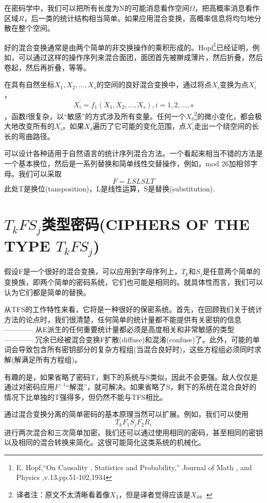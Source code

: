 \documentclass[]{article}
\begin{document}
在密码学中，我们可以把所有长度为N的可能消息看作空间$\Omega$，把高概率消息看作区域$R$，后一类的统计结构相当简单。如果应用混合变换，高概率信息将均匀地分散在整个空间。

好的混合变换通常是由两个简单的非交换操作的乘积形成的。Hopf\footnote{E. Hopf,“On Causality , Statistics and Probability,” Journal of Math , and Physics ,v.13,pp.51-102,1934 }已经证明，例如，可以通过这样的操作序列来混合面团，面团首先被擀成薄片，然后折叠，然后卷起，然后再折叠，等等。

在具有自然坐标$X_1,X_2,\ldots,X_s$的空间的良好混合变换中，通过将点$X_i$变换为点$X_i^{'}$，
\[X_i^{'}=f_1(X_1,X_2,\ldots,X_s),i=1,2,\ldots,s\]
，函数f很复杂，以“敏感”的方式涉及所有变量。任何一个$X_\delta$\footnote{译者注：原文不太清晰看着像$X_3$，但是译者觉得应该是$X_\delta$。}的微小变化，都会极大地改变所有的$X_i^{'}$。如果$X_\delta$遍历了它可能的变化范围，点$X_i^{'}$走出一个绕空间的长长的弯曲路径。

可以设计各种适用于自然语言的统计序列混合方法。一个看起来相当不错的方法是一个基本换位，然后是一系列替换和简单线性交替操作，例如，mod 26加相邻字母。我们可以采取
\[F=LSLSLT\]
此处T是换位(tansposition)，L是线性运算，S是替换(substitution).

\newpage
%   
%

\section{$T_k F S_j$类型密码(CIPHERS OF THE TYPE $T_k F S_j$)}

假设F是一个很好的混合变换，可以应用到字母序列上，$T_k$和$S_j$是任意两个简单的变换族，即两个简单的密码系统，它们也可能是相同的。就具体性而言，我们可以认为它们都是简单的替换。

从TFS的工作特性来看，它将是一种很好的保密系统。首先，在回顾我们关于统计方法的论点时，我们很清楚，任何简单的统计量都不能提供有关密钥的信息 ———— 从E派生的任何重要统计量都必须是高度相关和非常敏感的类型 ———— 冗余已经被混合变换F扩散(diffuse)和混淆(confuse)了。此外，可能的单词会导致包含所有密钥部分的复杂方程组(当混合良好时)，这些方程组必须同时求解(解满足所有方程组)。

有趣的是，如果省略了密码T，剩下的系统与S类似，因此不会更强。敌人仅仅是通过对密码应用$F^{-1}$“解混”，就可解决。如果省略了S，剩下的系统在混合良好的情况下比单独的T强得多，但仍然不能与TFS相比。

通过混合变换分离的简单密码的基本原理当然可以扩展。例如，我们可以使用
\[T_kF_1S_jF_2R_i\]
进行两次混合和三次简单加密。我们还可以通过使用相同的密码，甚至相同的密钥以及相同的混合转换来简化。这很可能简化这类系统的机械化。
\end{document}

